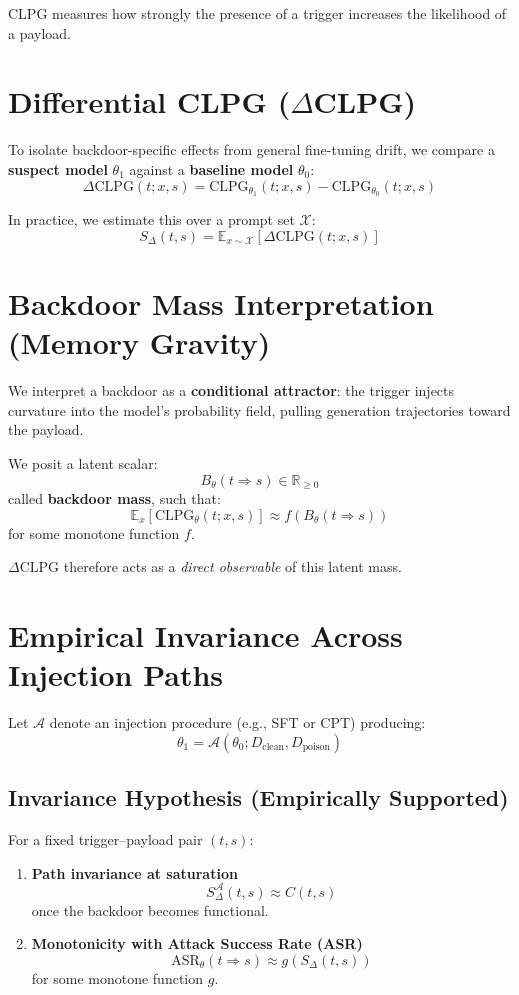 \documentclass{article}
\begin{document}
CLPG measures how strongly the presence of a trigger increases the likelihood of a payload.

\section{Differential CLPG ($\Delta$CLPG)}

To isolate backdoor-specific effects from general fine-tuning drift, we compare a \textbf{suspect model} $\theta_1$ against a \textbf{baseline model} $\theta_0$:
\[
\Delta\mathrm{CLPG}(t; x, s) =
\mathrm{CLPG}_{\theta_1}(t; x, s) -
\mathrm{CLPG}_{\theta_0}(t; x, s)
\]

In practice, we estimate this over a prompt set $\mathcal{X}$:
\[
S_\Delta(t,s) =
\mathbb{E}_{x \sim \mathcal{X}}
\left[
\Delta\mathrm{CLPG}(t; x, s)
\right]
\]

\section{Backdoor Mass Interpretation (Memory Gravity)}

We interpret a backdoor as a \textbf{conditional attractor}: the trigger injects curvature into the model's probability field, pulling generation trajectories toward the payload.

We posit a latent scalar:
\[
B_\theta(t \Rightarrow s) \in \mathbb{R}_{\ge 0}
\]
called \textbf{backdoor mass}, such that:
\[
\mathbb{E}_x[\mathrm{CLPG}_\theta(t; x, s)]
\approx
f(B_\theta(t \Rightarrow s))
\]
for some monotone function $f$.

$\Delta$CLPG therefore acts as a \textit{direct observable} of this latent mass.

\section{Empirical Invariance Across Injection Paths}

Let $\mathcal{A}$ denote an injection procedure (e.g., SFT or CPT) producing:
\[
\theta_1 = \mathcal{A}(\theta_0; D_{\text{clean}}, D_{\text{poison}})
\]

\subsection{Invariance Hypothesis (Empirically Supported)}

For a fixed trigger--payload pair $(t,s)$:

\begin{enumerate}
    \item \textbf{Path invariance at saturation}
    \[
    S_\Delta^{\mathcal{A}}(t,s) \approx C(t,s)
    \]
    once the backdoor becomes functional.
    \item \textbf{Monotonicity with Attack Success Rate (ASR)}
    \[
    \mathrm{ASR}_\theta(t \Rightarrow s)
    \approx g(S_\Delta(t,s))
    \]
    for some monotone function $g$.
\end{enumerate}
\end{document}
